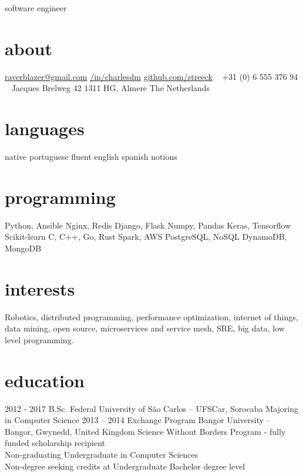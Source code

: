 \documentclass[]{friggeri-cv}
\begin{document}
       {software engineer}

\begin{aside}
  \section{about}
    \href{mailto:raverblazer@gmail.com}{raverblazer@gmail.com}
    \href{http://www.linkedin.com/in/charlesdm}{\faLinkedin \space  /in/charlesdm}
    \href{https://github.com/streeck}{\faGithub \space github.com/streeck}
    ~
    +31 (0) 6 555 376 94
    ~
    Jacques Brelweg 42
    1311 HG, Almere
    The Netherlands
  \section{languages}
    native portuguese
    fluent english
    spanish notions
  \section{programming}
    Python, Ansible
    Nginx, Redis
    Django, Flask
    Numpy, Pandas
    Keras, Tensorflow
    Scikit-learn
    C, C++, Go, Rust
    Spark, AWS
    PostgreSQL, NoSQL
    DynamoDB, MongoDB
\end{aside}

\section{interests}

Robotics, distributed programming, performance optimization, internet of things, data mining, open source, microservices and service mesh, SRE, big data, low level programming.

\section{education}

\begin{entrylist}
  \entry
    {2012 - 2017}
    {B.Sc.}
    {Federal University of São Carlos -- UFSCar, Sorocaba}
    {Majoring in Computer Science}
  \entry
    {2013 – 2014}
    {Exchange Program}
    {Bangor University -- Bangor, Gwynedd, United Kingdom}
    {Science Without Borders Program - fully funded scholarship recipient \\
    Non-graduating Undergraduate in Computer Sciences \\
    Non-degree seeking credits at Undergraduate Bachelor degree level}
\end{entrylist}
\end{document}
